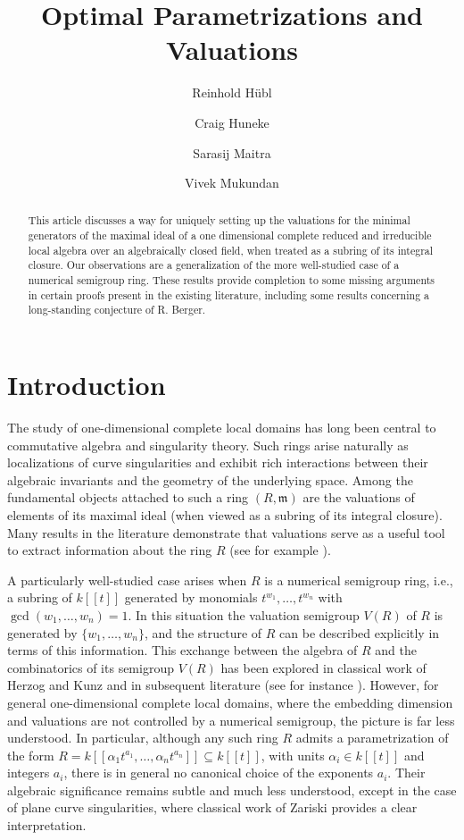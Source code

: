 \documentclass[12pt]{amsart}
\title{Optimal Parametrizations and Valuations}
\author[H\"ubl]{Reinhold H\"ubl}
\author[Huneke]{Craig Huneke}
\author[Maitra]{Sarasij Maitra}
\author[Mukundan]{Vivek Mukundan}
\theoremstyle{plain}%
\theoremstyle{definition}
\renewcommand{\(}{\left(}
\renewcommand{\)}{\right)}
\begin{document}
\begin{abstract}
    This article discusses a way for uniquely setting up the valuations for the minimal generators of the maximal ideal of a one dimensional complete reduced and irreducible local algebra over an algebraically closed field, when treated as a subring of its integral closure. Our observations are a generalization of the more well-studied case of a numerical semigroup ring. These results provide completion to some missing arguments in certain proofs present in the existing literature, including some results concerning a long-standing conjecture of R. Berger.
\end{abstract}
\maketitle
\section{Introduction}
The study of one-dimensional complete local domains has long been central to commutative algebra and singularity theory. Such rings arise naturally as localizations of curve singularities and exhibit rich interactions between their algebraic invariants and the geometry of the underlying space. Among the fundamental objects attached to such a ring $(R,\mathfrak{m})$ are the valuations of elements of its maximal ideal (when viewed as a subring of its integral closure). Many results in the literature demonstrate that valuations serve as a useful tool to extract  information about the ring $R$ (see for example \cite{Kunz70,HK,matsuoka1971degree,barucci1997maximality,d1997canonical,barucci2000analytically,oneto2007invariants,maitra2023extremal,herzog2023tiny,maitra2024two,kobayashi2025set}).

A particularly well-studied case arises when $R$ is a numerical semigroup ring, i.e., a subring of $k[[t]]$ generated by monomials $t^{w_1}, \dots, t^{w_n}$ with $\gcd(w_1,\dots,w_n)=1$. In this situation the valuation semigroup $V(R)$ of $R$ is generated by $\{w_1, \dots, w_n\}$, and the structure of $R$ can be described explicitly in terms of this information. This exchange between the algebra of $R$ and the combinatorics of its semigroup $V(R)$ has been explored in classical work of Herzog and Kunz \cite{HK} and in subsequent literature (see for instance \cite{barucci2006numerical,barucci2009propinquity,barucci2010,rosales2009irreducible,stamate2016betti,goto2018pseudo,endo2022ulrich,bhardwaj2024reduced,celikbas2024semidualizing}). However, for general one-dimensional complete local domains, where the embedding dimension and valuations are not controlled by a numerical semigroup, the picture is far less understood. In particular, although any such ring $R$ admits a parametrization of the form  $R = k[[\alpha_1 t^{a_1}, \dots, \alpha_n t^{a_n}]] \subseteq k[[t]]$, with units $\alpha_i \in k[[t]]$ and integers $a_i$, there is in general no canonical choice of the exponents $a_i$. Their algebraic significance remains subtle and much less understood, except in the case of plane curve singularities, where classical work of Zariski \cite{Zariskibook} provides a clear interpretation.
\end{document}
